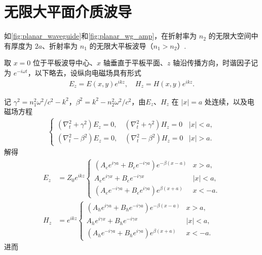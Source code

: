 \section{无限大平面介质波导}

如\cref{fig:planar_waveguide}和\cref{fig:planar_wg_amp}，在折射率为 \(n_2\) 的无限大空间中有厚度为 \(2a\)、折射率为 \(n_1\) 的无限大平板波导（\(n_1 > n_2\)）.

取 \(x = 0\) 位于平板波导中心、\(x\) 轴垂直于平板平面、\(z\) 轴沿传播方向，时谐因子记为 \(e^{-i\omega t}\)，以下略去，设纵向电磁场具有形式
\begin{align*}
	E_z = E(x, y) e^{ikz}, \quad H_z = H(x, y) e^{ikz}.
\end{align*}

记 \(\gamma^2 = n_1^2 \omega^2/c^2 - k^2\)，\(\beta^2 = k^2 - n_2^2 \omega^2/c^2\)，由\(E_z\)、\(H_z\) 在 \(|x| = a\) 处连续，以及电磁场方程
\begin{align*}
	\begin{cases}
		\left( \nabla_t^2 + \gamma^2 \right) E_z = 0, \quad \left( \nabla_t^2 + \gamma^2 \right) H_z = 0 & |x| < a, \\
		\left( \nabla_t^2 - \beta^2 \right) E_z = 0, \quad \left( \nabla_t^2 - \beta^2 \right) H_z = 0   & |x| > a.
	\end{cases}
\end{align*}
解得
\begin{align*}
	E_z &= Z_0 e^{ikz}
	\begin{cases}
		\left( A_e e^{i\gamma a} + B_e e^{-i\gamma a} \right) e^{-\beta(x - a)} & x > a,   \\
		A_e e^{i\gamma x} + B_e e^{-i\gamma x}                                  & |x| < a, \\
		\left( A_e e^{-i\gamma a} + B_e e^{i\gamma a} \right) e^{\beta(x + a)}  & x < -a.
	\end{cases}\\
	H_z &= e^{ikz}
	\begin{cases}
		\left( A_h e^{i\gamma a} + B_h e^{-i\gamma a} \right) e^{-\beta(x - a)} & x > a,   \\
		A_h e^{i\gamma x} + B_h e^{-i\gamma x}                                  & |x| < a, \\
		\left( A_h e^{-i\gamma a} + B_h e^{i\gamma a} \right) e^{\beta(x + a)}  & x < -a.
	\end{cases}
\end{align*}
进而
